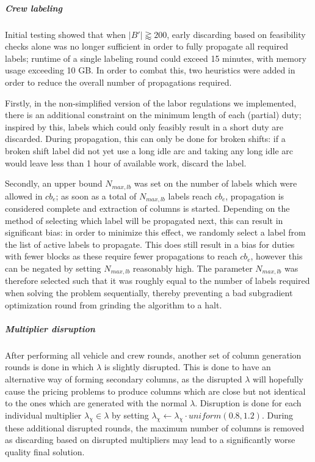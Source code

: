 \documentclass[]{article}
\begin{document}
\subparagraph{Crew labeling} Initial testing showed that when $|B'| \gtrapprox 200$, early discarding based on feasibility checks alone was no longer sufficient in order to fully propagate all required labels; runtime of a single labeling round could exceed 15 minutes, with memory usage exceeding 10 GB. In order to combat this, two heuristics were added in order to reduce the overall number of propagations required.

Firstly, in the non-simplified version of the labor regulations we implemented, there is an additional constraint on the minimum length of each (partial) duty; inspired by this, labels which could only feasibly result in a short duty are discarded. During propagation, this can only be done for broken shifts: if a broken shift label did not yet use a long idle arc and taking any long idle arc would leave less than 1 hour of available work, discard the label.

Secondly, an upper bound $N_{max,lb}$ was set on the number of labels which were allowed in $cb_e$; as soon as a total of $N_{max,lb}$ labels reach $cb_e$, propagation is considered complete and extraction of columns is started. Depending on the method of selecting which label will be propagated next, this can result in significant bias: in order to minimize this effect, we randomly select a label from the list of active labels to propagate. This does still result in a bias for duties with fewer blocks as these require fewer propagations to reach $cb_e$, however this can be negated by setting $N_{max,lb}$ reasonably high. The parameter $N_{max,lb}$ was therefore selected such that it was roughly equal to the number of labels required when solving the problem sequentially, thereby preventing a bad subgradient optimization round from grinding the algorithm to a halt.

\subparagraph{Multiplier disruption} After performing all vehicle and crew rounds, another set of column generation rounds is done in which $\lambda$ is slightly disrupted. This is done to have an alternative way of forming secondary columns, as the disrupted $\lambda$ will hopefully cause the pricing problems to produce columns which are close but not identical to the ones which are generated with the normal $\lambda$. Disruption is done for each individual multiplier $\lambda_\chi \in \lambda$ by setting $\lambda_\chi \gets \lambda_\chi \cdot \textit{uniform}(0.8,1.2)$. During these additional disrupted rounds, the maximum number of columns is removed as discarding based on disrupted multipliers may lead to a significantly worse quality final solution. 
\end{document}
